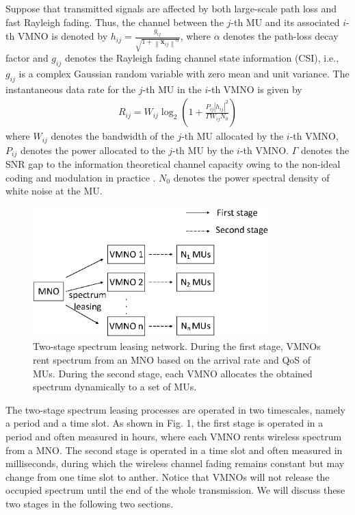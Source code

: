 \documentclass[journal]{IEEEtran}
\begin{document}
Suppose that transmitted signals are affected by both large-scale path loss and fast Rayleigh fading. Thus, the channel between the $j$-th MU and its associated $i$-th VMNO is denoted by $h_{ij} = \frac{g_{ij}}{\sqrt{1 + {\left\| \mathbf{x}_{ij} \right\|}^\alpha}}$, where $\alpha$ denotes the path-loss decay factor  and $g_{ij}$ denotes the Rayleigh fading channel state information (CSI), i.e., $g_{ij}$ is a complex Gaussian random variable with zero mean and unit variance. The instantaneous data rate for the $j$-th MU in the $i$-th VMNO is given by
\begin{align}
	R_{ij} = W_{ij}\log_2\left(1 + \frac{P_{ij} \left|h_{ij} \right|^2 }{\Gamma W_{ij}N_0}\right)
\end{align}
where $W_{ij}$ denotes the bandwidth of the $j$-th MU allocated by the $i$-th VMNO, $P_{ij}$ denotes the power allocated to the $j$-th MU by the $i$-th VMNO. $\Gamma$ denotes the SNR gap to the information theoretical channel capacity owing to the
non-ideal coding and modulation in practice \cite{JGDForney}. $N_0$ denotes the power spectral density of white noise at the MU.                      
\begin{figure}
	\centering
	\includegraphics[width=3.6in]{Pic1.eps}
	\caption{Two-stage spectrum leasing network. During the first stage, VMNOs rent spectrum from an MNO based on the arrival rate and QoS of MUs. During the second stage, each VMNO allocates the obtained spectrum dynamically to a set of MUs.}
\end{figure}

The two-stage spectrum leasing processes are operated in two timescales, namely a period and a time slot. As shown in Fig. 1, the first stage is operated in a period and often measured in hours, where each VMNO rents wireless spectrum from a MNO. The second stage is operated in a time slot and often measured in milliseconds, during which the  wireless channel fading remains constant but may change from one time slot to anther. Notice that VMNOs will not release the occupied spectrum until the end of the whole transmission. We will discuss these two stages in the following two sections.
\end{document}
